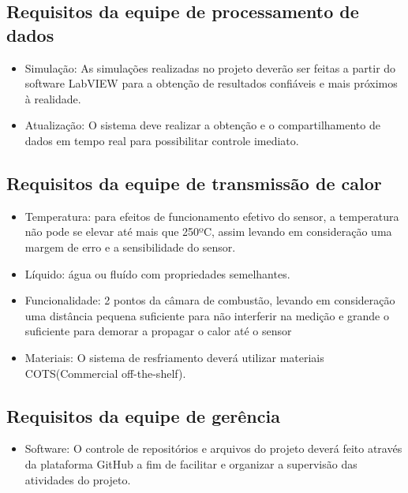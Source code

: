 \subsection{Requisitos da equipe de processamento de dados}
\begin{itemize}
\item Simulação: As simulações realizadas no projeto deverão ser feitas a partir do software LabVIEW para a obtenção de resultados confiáveis e mais próximos à realidade.
\item Atualização: O sistema deve realizar a obtenção e o compartilhamento de dados em tempo real para possibilitar controle imediato.
\end{itemize}

\subsection{Requisitos da equipe de transmissão de calor}
\begin{itemize}
\item Temperatura: para efeitos de funcionamento efetivo do sensor, a temperatura não pode se elevar até mais que 250ºC, assim levando em consideração uma margem de erro e a sensibilidade do sensor. 
\item Líquido: água ou fluído com propriedades semelhantes.
\item Funcionalidade: 2 pontos da câmara de combustão, levando em consideração uma distância pequena suficiente para não interferir na medição e grande o suficiente para demorar a propagar o calor até o sensor
\item Materiais: O sistema de resfriamento deverá utilizar materiais COTS(Commercial off-the-shelf).
\end{itemize}

\subsection{Requisitos da equipe de gerência}
\begin{itemize}
\item Software: O controle de repositórios e arquivos do projeto deverá feito através da plataforma GitHub a fim de facilitar e organizar a supervisão das atividades do projeto.
\end{itemize}
